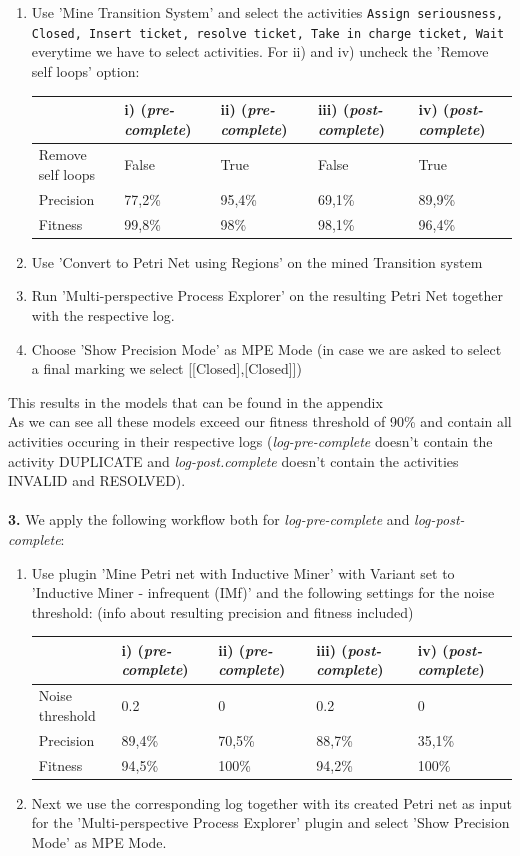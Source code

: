 \documentclass[../../main.tex]{subfiles}
\begin{document}
\begin{enumerate}
\item Use 'Mine Transition System' and select the activities \texttt{Assign seriousness, Closed, Insert ticket, resolve ticket, Take in charge ticket, Wait} everytime we have to select activities.
For ii) and iv) uncheck the 'Remove self loops' option:
\begin{table}[h!]
\begin{tabular}{l|llll}
           & i) (\textit{pre-complete}) & ii) (\textit{pre-complete}) & iii) (\textit{post-complete}) & iv) (\textit{post-complete})\\
           \hline
Remove self loops & False & True & False & True \\
\hline
Precision & 77,2\% & 95,4\% & 69,1\% & 89,9\% \\
Fitness   & 99,8\% & 98\%   & 98,1\% & 96,4\% \\
\end{tabular}
\end{table}
\item Use 'Convert to Petri Net using Regions' on the mined Transition system
\item Run 'Multi-perspective Process Explorer' on the resulting Petri Net together with the respective log.
\item Choose 'Show Precision Mode' as MPE Mode (in case we are asked to select a final marking we select [[Closed],[Closed]])
\end{enumerate}
This results in the models that can be found in the appendix\\
As we can see all these models exceed our fitness threshold of 90\% and contain all activities occuring in their respective logs (\textit{log-pre-complete} doesn't contain the activity DUPLICATE and \textit{log-post.complete} doesn't contain the activities INVALID and RESOLVED).
\\ \ \\
\textbf{3.} We apply the following workflow both for \textit{log-pre-complete} and \textit{log-post-complete}:
\begin{enumerate}
\item Use plugin 'Mine Petri net with Inductive Miner' with Variant set to 'Inductive Miner - infrequent (IMf)' and the following settings for the noise threshold: (info about resulting precision and fitness included)
\begin{table}[h!]
\begin{tabular}{l|llll}
           & i) (\textit{pre-complete}) & ii) (\textit{pre-complete}) & iii) (\textit{post-complete}) & iv) (\textit{post-complete})\\
           \hline
Noise threshold & 0.2 & 0 & 0.2 & 0 \\
\hline
Precision & 89,4\% & 70,5\% & 88,7\% & 35,1\% \\
Fitness   & 94,5\% & 100\%  & 94,2\% & 100\%  \\
\end{tabular}
\end{table}
\item Next we use the corresponding log together with its created Petri net as input for the 'Multi-perspective Process Explorer' plugin and select 'Show Precision Mode' as MPE Mode.
\end{enumerate}
\end{document}
